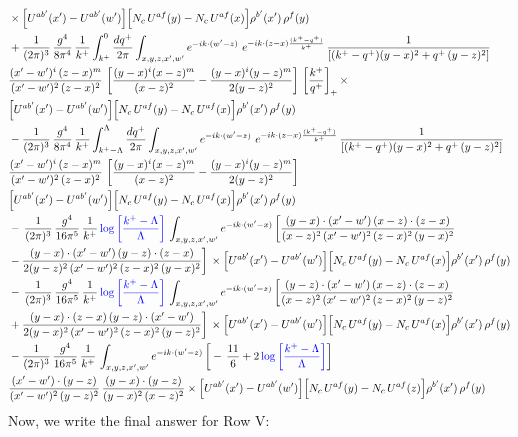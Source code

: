 \documentclass[9pt]{article}
\numberwithin{equation}{section}
\begin{document}
\begin{align}
&\times\Big[U^{ab'}(x')-U^{ab'}(w')\Big]\Big[N_{c}\,U^{af}(y)-N_{c}\,U^{af}(x)\Big]\rho^{b'}(x')\,\rho^{f}(y)\notag \\ & + \frac{1}{(2\pi)^{3}}\,\frac{g^{4}}{8\pi^{4}}\,\frac{1}{k^{+}}\int_{k^{+}}^{0}\frac{dq^{+}}{2\pi}\int_{x,y,z,x',w'}e^{-ik\cdot(w'-z)}\ e^{-ik\cdot(z-x)\frac{(k^{+}-q^{+})}{k^{+}}}\,\frac{1}{\left[(k^{+}-q^{+})(y-x)^{2}+q^{+}\,(y-z)^{2}\right]}\notag \\ & \frac{(x'-w')^{i}\,(z-x)^{m}}{(x'-w')^{2}\,(z-x)^{2}}\,\left[\frac{(y-x)^{i}(x-z)^{m}}{(x-z)^{2}}-\frac{(y-x)^{i}(y-z)^{m}}{2(y-z)^{2}}\right]\,\left[\frac{k^{+}}{q^{+}}\right]_{+}\times\notag \\ & \Big[U^{ab'}(x')-U^{ab'}(w')\Big]\Big[N_{c}\,U^{af}(y)-N_{c}\,U^{af}(x)\Big]\rho^{b'}(x')\,\rho^{f}(y)\notag \\ & - \frac{1}{(2\pi)^{3}}\,\frac{g^{4}}{8\pi^{4}}\,\frac{1}{k^{+}}\int_{k^{+}-\Lambda}^{\Lambda}\frac{dq^{+}}{2\pi}\int_{x,y,z,x',w'}e^{-ik\cdot(w'-z)}\ e^{-ik\cdot(z-x)\frac{(k^{+}-q^{+})}{k^{+}}}\,\frac{1}{\left[(k^{+}-q^{+})(y-x)^{2}+q^{+}\,(y-z)^{2}\right]}\notag \\ & \frac{(x'-w')^{i}\,(z-x)^{m}}{(x'-w')^{2}\,(z-x)^{2}}\,\left[\frac{(y-x)^{i}(x-z)^{m}}{(x-z)^{2}}-\frac{(y-x)^{i}(y-z)^{m}}{2(y-z)^{2}}\right]\notag \\ & \Big[U^{ab'}(x')-U^{ab'}(w')\Big]\Big[N_{c}\,U^{af}(y)-N_{c}\,U^{af}(x)\Big]\rho^{b'}(x')\,\rho^{f}(y)\notag \\ & -\, \frac{1}{(2\pi)^{3}}\,\frac{g^{4}}{16\pi^{5}}\,\frac{1}{k^{+}}\,{\color{blue}\log{\left[\frac{k^{+}-\Lambda}{\Lambda}\right]}}\,\int_{x,y,z,x',w'}e^{-ik\cdot(w'-x)}\, \bigg[\frac{(y-x)\cdot (x'-w')\,(x-z)\cdot (z-x)}{(x-z)^{2}\,(x'-w')^{2}\,(z-x)^{2}\,(y-x)^{2}}\notag \\ & -\frac{(y-x)\cdot (x'-w')\,(y-z)\cdot (z-x)}{2(y-z)^{2}\,(x'-w')^{2}\,(z-x)^{2}\,(y-x)^{2}}\bigg]\,\times \Big[U^{ab'}(x')-U^{ab'}(w')\Big]\Big[N_{c}\,U^{af}(y)-N_{c}\,U^{af}(x)\Big]\rho^{b'}(x')\,\rho^{f}(y)\notag \\ & -\, \frac{1}{(2\pi)^{3}}\,\frac{g^{4}}{16\pi^{5}}\,\frac{1}{k^{+}}\,{\color{blue}\log{\left[\frac{k^{+}-\Lambda}{\Lambda}\right]}}\,\int_{x,y,z,x',w'}e^{-ik\cdot(w'-z)}\,\bigg[\frac{(y-z)\cdot (x'-w')\,(x-z)\cdot (z-x)}{(x-z)^{2}\,(x'-w')^{2}\,(z-x)^{2}\,(y-z)^{2}}\notag \\ & +\frac{(y-x)\cdot (z-x)\,(y-z)\cdot (x'-w')}{2(y-x)^{2}\,(x'-w')^{2}\,(z-x)^{2}\,(y-z)^{2}}\bigg]\,\times \Big[U^{ab'}(x')-U^{ab'}(w')\Big]\Big[N_{c}\,U^{af}(y)-N_{c}\,U^{af}(x)\Big]\rho^{b'}(x')\,\rho^{f}(y)\notag \\ & - \frac{1}{(2\pi)^{3}}\,\frac{g^{4}}{16\pi^{5}}\,\frac{1}{k^{+}}\,\int_{x,y,z,x',w'}e^{-ik\cdot(w'-z)}\,\bigg[-\,\frac{11}{6}+2\,{\color{blue}\log{\left[\frac{k^{+}-\Lambda}{\Lambda}\right]}}\bigg]\notag \\ & \frac{(x'-w')\cdot(y-z)}{(x'-w')^{2}\,(y-z)^{2}}\,\frac{(y-x)\cdot(y-z)}{(y-x)^{2}\,(x-z)^{2}}\times\Big[U^{ab'}(x')-U^{ab'}(w')\Big]\Big[N_{c}\,U^{af}(y)-N_{c}\,U^{af}(z)\Big]\rho^{b'}(x')\,\rho^{f}(y)
\end{align}
Now, we write the final answer for Row V:
\end{document}
